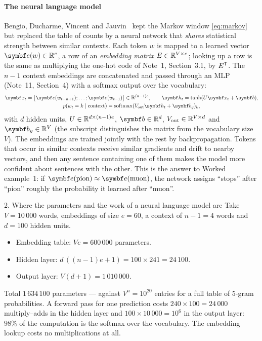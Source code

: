 \documentclass[11pt]{article}
\newcommand{\hv}{\vect{h}}
\newcommand{\bv}{\vect{b}}
\newcommand{\ev}{\vect{e}}
\newcommand{\softmax}{\operatorname{softmax}}
\begin{document}
\paragraph{The neural language model} Bengio, Ducharme, Vincent and Jauvin~\cite{bengio2003} kept the Markov window
\eqref{eq:markov} but replaced the table of counts by a neural network that \emph{shares} statistical strength between
similar contexts. Each token $w$ is mapped to a learned vector $\ev(w) \in \R^e$, a row of an \emph{embedding matrix}
$E \in \mathbb{R}^{V \times e}$; looking up a row is the same as multiplying the one-hot code of Note~1, Section~3.1, by $E^{\mathsf{T}}$. The
$n - 1$ context embeddings are concatenated and passed through an MLP (Note~11, Section~4) with a softmax output over the
vocabulary:
\begin{equation}\label{eq:nplm}
\begin{gathered}
  \x_t = \big[\ev(w_{t-n+1}); \dots; \ev(w_{t-1})\big] \in \R^{(n-1)e}, \qquad
  \hv_t = \tanh(U\x_t + \bv), \\
  p(w_t = k \mid \text{context}) = \softmax(V_{\mathrm{out}}\hv_t + \bv_y)_k ,
\end{gathered}
\end{equation}
with $d$ hidden units, $U \in \mathbb{R}^{d \times (n-1)e}$, $\bv \in \R^d$, $V_{\mathrm{out}} \in \mathbb{R}^{V \times d}$ and
$\bv_y \in \R^V$ (the subscript distinguishes the matrix from the vocabulary size $V$).
The embeddings are trained jointly with the rest by backpropagation. Tokens that occur in similar contexts receive
similar gradients and drift to nearby vectors, and then any sentence containing one of them makes the model more
confident about sentences with the other. This is the answer to Worked example~1: if $\ev(\text{pion}) \approx
\ev(\text{muon})$, the network assigns ``stops'' after ``pion'' roughly the probability it learned after ``muon''.

\begin{worked}{2. Where the parameters and the work of a neural language model are}
Take $V = 10\,000$ words, embeddings of size $e = 60$, a context of $n - 1 = 4$ words and $d = 100$ hidden units.
\begin{itemize}
\item Embedding table: $V e = 600\,000$ parameters.
\item Hidden layer: $d\,((n-1)e + 1) = 100 \times 241 = 24\,100$.
\item Output layer: $V(d + 1) = 1\,010\,000$.
\end{itemize}
Total $1\,634\,100$ parameters --- against $V^{n} = 10^{20}$ entries for a full table of 5-gram probabilities. A forward
pass for one prediction costs $240 \times 100 = 24\,000$ multiply--adds in the hidden layer and $100 \times 10\,000 =
10^6$ in the output layer: $98\%$ of the computation is the softmax over the vocabulary. The embedding lookup costs no
multiplications at all.
\end{worked}
\end{document}
